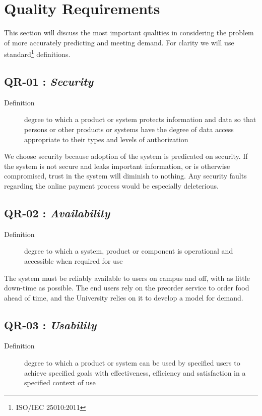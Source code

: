 \documentclass[11pt]{article}
\begin{document}
\section{Quality Requirements}
\label{sec:orgfa78248}

This section will discuss the most important qualities in
considering the problem of more accurately predicting and meeting
demand. For clarity we will use standard\footnote{ISO/IEC 25010:2011} definitions.

\subsection{\label{org7121fd4}QR-01 : \emph{Security}}
\label{sec:orgcf0e4f9}
\begin{description}
\item[{Definition}] degree to which a product or system protects
information and data so that persons or other
products or systems have the degree of data access
appropriate to their types and levels of
authorization
\end{description}


We choose security because adoption of the system is predicated on
security. If the system is not secure and leaks important
information, or is otherwise compromised, trust in the system will
diminish to nothing. Any security faults regarding the online
payment process would be especially deleterious.
\subsection{\label{orgde82f1e}QR-02 : \emph{Availability}}
\label{sec:orgf4f0473}
\begin{description}
\item[{Definition}] degree to which a system, product or component is
operational and accessible when required for use
\end{description}


The system must be reliably available to users on campus and off,
with as little down-time as possible. The end users rely on the
preorder service to order food ahead of time, and the University
relies on it to develop a model for demand.

\subsection{\label{orgdd2ce33}QR-03 : \emph{Usability}}
\label{sec:org841934c}
\begin{description}
\item[{Definition}] degree to which a product or system can be used by
specified users to achieve specified goals with
effectiveness, efficiency and satisfaction in a
specified context of use
\end{description}
\end{document}
